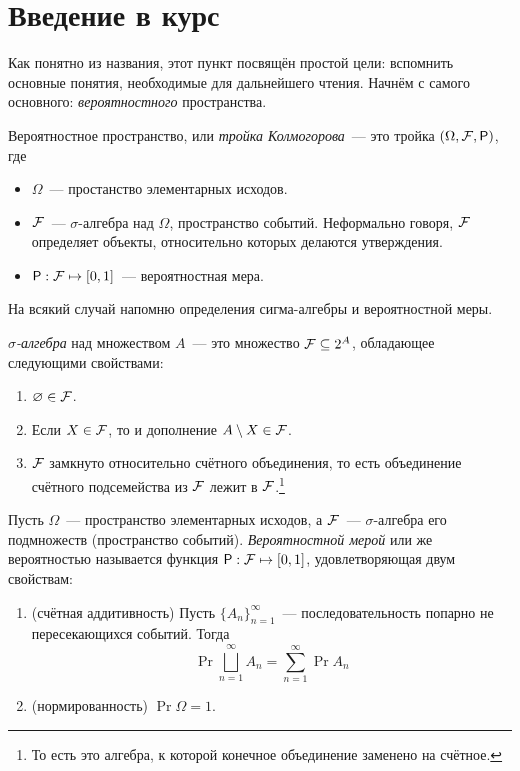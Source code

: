 \section{Введение в курс}
Как понятно из названия, этот пункт посвящён простой цели: вспомнить основные 
понятия, необходимые для дальнейшего чтения. Начнём с самого основного: 
\emph{вероятностного} пространства.

\begin{definition}
	Вероятностное пространство, или \emph{тройка Колмогорова}~--- это тройка 
	\((\Omega, \F, \Pr)\), где
	\begin{itemize}
		\item \(\Omega\)~--- простанство элементарных исходов. 
		\item \(\mathcal{F}\)~--- \(\sigma\)-алгебра над \(\Omega\), пространство 
		событий. Неформально говоря, \(\mathcal{F}\) определяет объекты, относительно 
		которых делаются утверждения. 
		\item \(\Pr : \F \mapsto [0, 1]\)~--- вероятностная мера. 
	\end{itemize}
\end{definition}

На всякий случай напомню определения сигма-алгебры и вероятностной меры.
\begin{definition}
	\emph{\(\sigma\)-алгебра} над множеством \(A\)~--- это множество \(\mathcal{F} 
	\subseteq 
	2^{A}\), обладающее следующими свойствами:
	\begin{enumerate}
		\item \(\varnothing \in \mathcal{F}\).
		\item Если \(X \in \mathcal{F}\), то и дополнение \(A \setminus X \in \mathcal{F}\).
		\item \(\mathcal{F}\) замкнуто относительно счётного объединения, то есть 
		объединение счётного подсемейства из \(\mathcal{F}\) лежит в \(\mathcal{F}\).\footnote{То 
		есть это алгебра, к которой конечное объединение заменено на счётное.}
	\end{enumerate}
\end{definition}

\begin{definition}
	Пусть \(\Omega\)~--- пространство элементарных исходов, а \(\mathcal{F}\)~--- 
	\(\sigma\)-алгебра его подмножеств (пространство событий). 
	\emph{Вероятностной мерой} или же вероятностью называется функция \(\Pr : 
	\F \mapsto [0, 1]\), удовлетворяющая двум свойствам:
	\begin{enumerate}
		\item (счётная аддитивность) Пусть \(\{A_{n}\}_{n = 1}^{\infty}\)~--- 
		последовательность попарно не пересекающихся событий. Тогда
		\[
		\Pr{\bigsqcup_{n = 1}^{\infty} A_{n}} = \sum_{n = 1}^{\infty} 
		\Pr{A_{n}}
		\]
		
		\item (нормированность) \(\Pr{\Omega} = 1\).
	\end{enumerate}
\end{definition}

